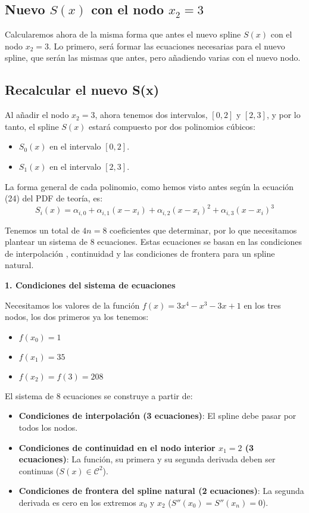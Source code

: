 \documentclass{article}
\begin{document}
\subsection{Nuevo $S(x)$ con el nodo $x_2=3$}

Calcularemos ahora de la misma forma que antes el nuevo spline \(S(x)\) con el nodo \(x_2=3\). Lo primero, será formar las ecuaciones necesarias para el nuevo spline, que serán las mismas que antes, pero añadiendo varias con el nuevo nodo.

\subsection*{Recalcular el nuevo S(x)}

Al añadir el nodo $x_2=3$, ahora tenemos dos intervalos, $[0, 2]$ y $[2, 3]$, y por lo tanto, el spline $S(x)$ estará compuesto por dos polinomios cúbicos:
\begin{itemize}
    \item $S_0(x)$ en el intervalo $[0, 2]$.
    \item $S_1(x)$ en el intervalo $[2, 3]$.
\end{itemize}

La forma general de cada polinomio, como hemos visto antes según la ecuación (24) del PDF de teoría, es:
$$S_i(x) = \alpha_{i,0} + \alpha_{i,1}(x-x_i) + \alpha_{i,2}(x-x_i)^2 + \alpha_{i,3}(x-x_i)^3$$

Tenemos un total de $4n=8$ coeficientes que determinar, por lo que necesitamos plantear un sistema de 8 ecuaciones. Estas ecuaciones se basan en las condiciones de interpolación , continuidad  y las condiciones de frontera para un spline natural.

\textbf{1. Condiciones del sistema de ecuaciones}

Necesitamos los valores de la función $f(x) = 3x^4 - x^3 - 3x + 1$ en los tres nodos, los dos primeros ya los tenemos:
\begin{itemize}
    \item $f(x_0) = 1$
    \item $f(x_1) = 35$
    \item $f(x_2) = f(3) = 208$
\end{itemize}

El sistema de 8 ecuaciones se construye a partir de:
\begin{itemize}
    \item \textbf{Condiciones de interpolación (3 ecuaciones)}: El spline debe pasar por todos los nodos.
    \item \textbf{Condiciones de continuidad en el nodo interior $x_1=2$ (3 ecuaciones)}: La función, su primera y su segunda derivada deben ser continuas ($S(x) \in \mathcal{C}^2$).
    \item \textbf{Condiciones de frontera del spline natural (2 ecuaciones)}: La segunda derivada es cero en los extremos $x_0$ y $x_2$ ($S''(x_0)=S''(x_n)=0$).
\end{itemize}
\end{document}
